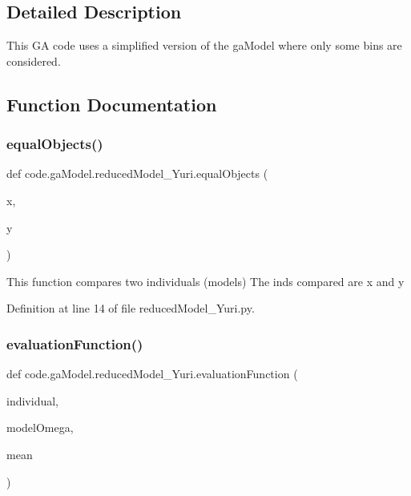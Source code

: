 \subsection{Detailed Description}
\begin{DoxyVerb}This GA code uses a simplified version of the gaModel where only some bins are considered.
\end{DoxyVerb}
 

\subsection{Function Documentation}
\mbox{\label{namespacecode_1_1ga_model_1_1reduced_model___yuri_ae7bad5e83a55b1cf2866cf0ba552a6e5}} 
\subsubsection{\texorpdfstring{equal\+Objects()}{equalObjects()}}
{\footnotesize\ttfamily def code.\+ga\+Model.\+reduced\+Model\+\_\+\+Yuri.\+equal\+Objects (\begin{DoxyParamCaption}\item[{}]{x,  }\item[{}]{y }\end{DoxyParamCaption})}

\begin{DoxyVerb}This function compares two individuals (models)
The inds compared are x and y
\end{DoxyVerb}
 

Definition at line 14 of file reduced\+Model\+\_\+\+Yuri.\+py.

\mbox{\label{namespacecode_1_1ga_model_1_1reduced_model___yuri_a8260255d22c11bcb56267899e732bb25}} 
\subsubsection{\texorpdfstring{evaluation\+Function()}{evaluationFunction()}}
{\footnotesize\ttfamily def code.\+ga\+Model.\+reduced\+Model\+\_\+\+Yuri.\+evaluation\+Function (\begin{DoxyParamCaption}\item[{}]{individual,  }\item[{}]{model\+Omega,  }\item[{}]{mean }\end{DoxyParamCaption})}

